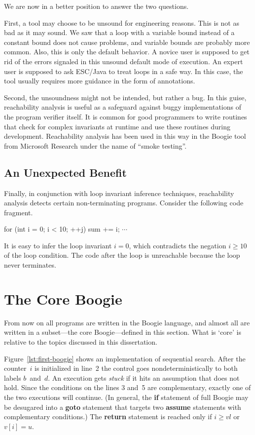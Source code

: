 \documentclass[a4paper]{article}
\newcommand{\escjava}{ESC\slash Java\xspace}
\theoremstyle{slanted}
\theoremstyle{definition}
\theoremstyle{remark}
\begin{document}
We are now in a better position to answer the two questions.

First, a tool may choose to be unsound for engineering reasons.
This is not as bad as it may sound. We saw that a loop with
a variable bound instead of a constant bound does not cause
problems, and variable bounds are probably more common. Also,
this is only the default behavior. A novice user is supposed to
get rid of the errors signaled in this unsound default mode of
execution. An expert user is supposed to ask \escjava to treat
loops in a safe way. In this case, the tool usually requires more
guidance in the form of annotations. 

Second, the unsoundness might not be intended, but rather a bug.
In this guise, reachability analysis is useful as a safeguard
against buggy implementations of the program verifier itself.
It is common for good programmers to write routines that check
for complex invariants at runtime and use these routines during
development. Reachability analysis has been used in this way in
the Boogie tool from Microsoft Research under the name of ``smoke
testing''.

\subsection{An Unexpected Benefit}

Finally, in conjunction with loop invariant inference techniques,
reachability analysis detects certain non-terminating programs.
Consider the following code fragment.
\begin{jml}
for (int i = 0; i < 10; ++j) 
  sum += i;
$\cdots$
\end{jml}
It is easy to infer the loop invariant $i=0$, which contradicts
the negation $i\ge10$ of the loop condition. The code after the
loop is unreachable because the loop never terminates.
\section{The Core Boogie}
\label{sec:boogie}

 From now on all programs are written in the Boogie
language, and almost all are written in a subset---the core
Boogie---defined in this section. What is `core' is relative to
the topics discussed in this dissertation.

Figure~\ref{lst:first-boogie} shows an implementation of
sequential search. After the counter~$i$ is initialized in line~2
the control goes nondeterministically to both labels $b$~and~$d$.
An execution gets \emph{stuck} if it hits an assumption that
does not hold. Since the conditions on the lines 3 and~5 are
complementary, exactly one of the two executions will continue.
(In general, the \textbf{if} statement of full Boogie may be
desugared into a \textbf{goto} statement that targets two
\textbf{assume} statements with complementary conditions.) The
\textbf{return} statement is reached only if $i \ge \mathit{vl}$
or $v[i]=u$.
\end{document}
